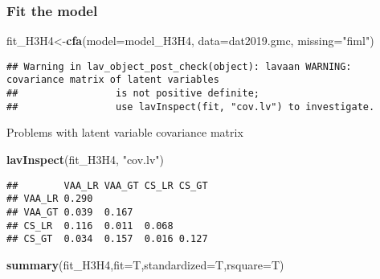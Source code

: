 \documentclass[
]{article}
\newenvironment{Shaded}{\begin{snugshade}}{\end{snugshade}}
\newcommand{\DataTypeTok}[1]{\textcolor[rgb]{0.13,0.29,0.53}{#1}}
\newcommand{\KeywordTok}[1]{\textcolor[rgb]{0.13,0.29,0.53}{\textbf{#1}}}
\newcommand{\NormalTok}[1]{#1}
\newcommand{\StringTok}[1]{\textcolor[rgb]{0.31,0.60,0.02}{#1}}
\begin{document}
\hypertarget{fit-the-model-1}{%
\subsubsection{Fit the model}\label{fit-the-model-1}}

\begin{Shaded}
\begin{Highlighting}[]
\NormalTok{fit_H3H4<-}\KeywordTok{cfa}\NormalTok{(}\DataTypeTok{model=}\NormalTok{model_H3H4,}
              \DataTypeTok{data=}\NormalTok{dat2019.gmc,}
              \DataTypeTok{missing=}\StringTok{"fiml"}\NormalTok{)}
\end{Highlighting}
\end{Shaded}

\begin{verbatim}
## Warning in lav_object_post_check(object): lavaan WARNING: covariance matrix of latent variables
##                 is not positive definite;
##                 use lavInspect(fit, "cov.lv") to investigate.
\end{verbatim}

Problems with latent variable covariance matrix

\begin{Shaded}
\begin{Highlighting}[]
\KeywordTok{lavInspect}\NormalTok{(fit_H3H4, }\StringTok{"cov.lv"}\NormalTok{)}
\end{Highlighting}
\end{Shaded}

\begin{verbatim}
##        VAA_LR VAA_GT CS_LR CS_GT
## VAA_LR 0.290                    
## VAA_GT 0.039  0.167             
## CS_LR  0.116  0.011  0.068      
## CS_GT  0.034  0.157  0.016 0.127
\end{verbatim}

\begin{Shaded}
\begin{Highlighting}[]
\KeywordTok{summary}\NormalTok{(fit_H3H4,}\DataTypeTok{fit=}\NormalTok{T,}\DataTypeTok{standardized=}\NormalTok{T,}\DataTypeTok{rsquare=}\NormalTok{T)}
\end{Highlighting}
\end{Shaded}
\end{document}
